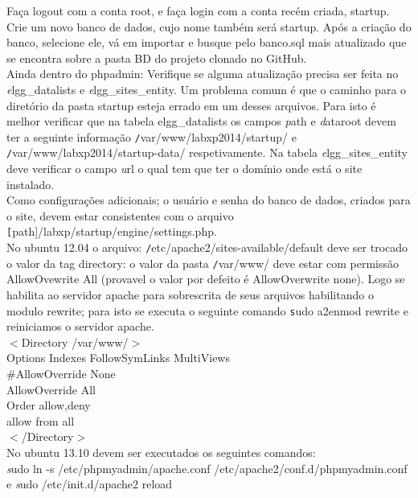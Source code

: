 \documentclass[12pt, letterpaper, onecolumn]{article}
\begin{document}
Faça logout com a conta root, e faça login com a conta recém criada, startup. Crie um novo banco de dados, cujo nome também será startup. Após a criação do banco, selecione ele, vá em importar e busque pelo banco.sql mais atualizado que se encontra sobre a pasta BD do projeto clonado no GitHub.\\

Ainda dentro do phpadmin: Verifique se alguma atualização precisa ser feita no {\textit elgg\_datalists} e {\textit elgg\_sites\_entity}. Um problema comum é que o caminho para o diretório da pasta startup esteja errado em um desses arquivos. Para isto é melhor verificar que na tabela elgg\_datalists os campos {\textit path} e {\textit dataroot} devem ter a seguinte informação {\texttt /var/www/labxp2014/startup/} e {\texttt /var/www/labxp2014/startup-data/} respetivamente. Na tabela {\textit elgg\_sites\_entity} deve verificar o campo  {\textit url } o qual tem que ter o domínio onde está o site instalado.\\

Como configurações adicionais; o usuário e senha do banco de dados, criados para o site, devem estar consistentes com o arquivo {\texttt [path]/labxp/startup/engine/settings.php}.\\

No ubuntu 12.04 o arquivo: {\texttt /etc/apache2/sites-available/default} deve ser trocado o valor da tag directory: o valor da pasta {\texttt /var/www/} deve estar  com permissão AllowOvewrite All (provavel o valor por defeito é AllowOverwrite none). Logo se habilita ao servidor apache para sobrescrita de seus arquivos habilitando o modulo rewrite; para isto se executa o seguinte comando {\texttt sudo a2enmod rewrite} e reiniciamos o servidor apache.\\

$<$Directory /var/www/$>$\\
Options Indexes FollowSymLinks MultiViews\\
\#AllowOverride None\\
AllowOverride All\\
Order allow,deny\\
allow from all\\
$<$/Directory$>$\\

No ubuntu 13.10 devem ser executados os seguintes comandos:\\
{\textit sudo ln -s /etc/phpmyadmin/apache.conf /etc/apache2/conf.d/phpmyadmin.conf } e {\textit sudo /etc/init.d/apache2 reload}
\end{document}
